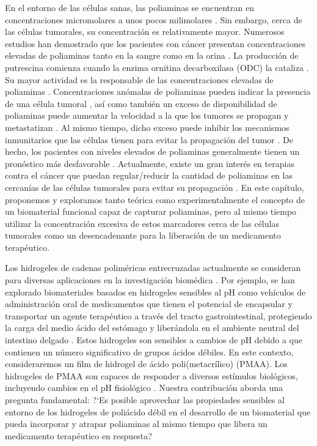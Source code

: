 En el entorno de las c\'elulas sanas, las poliaminas se encuentran en concentraciones micromolares a unos pocos milimolares \cite{porter1983, Russell}.
Sin embargo, cerca de las c\'elulas tumorales, su concentraci\'on es relativamente mayor.
Numerosos estudios han demostrado que los pacientes con c\'ancer presentan concentraciones elevadas de poliaminas tanto en la sangre como en la orina \cite{russell1971}. La producci\'on de putrescina comienza cuando la enzima ornitina decarboxilasa (ODC) la cataliza \cite{Soda2011,casero2009,pegg2010}. Su mayor actividad es la responsable de las concentraciones elevadas de poliaminas \cite{Soda2011,agostinelli2010polyamines,nowotarski2013}.
Concentraciones an\'omalas de poliaminas pueden indicar la presencia de una c\'elula tumoral \cite{park2013,gerner2004}, as\'i como tambi\'en un exceso de disponibilidad de poliaminas puede aumentar la velocidad a la que los tumores se propagan y metastatizan \cite{Soda2011}.
Al mismo tiempo, dicho exceso puede inhibir los mecanismos inmunitarios que las c\'elulas tienen para evitar la propagaci\'on del tumor \cite{Soda2011,jasnis1994polyamines}.
De hecho, los pacientes con niveles elevados de poliaminas generalmente tienen un pron\'ostico m\'as desfavorable \cite{Soda2011,ikeda2011montmorillonite}.
Actualmente, existe un gran inter\'es en terapias contra el c\'ancer que puedan regular/reducir la cantidad de poliaminas en las cercan\'ias de las c\'elulas tumorales para evitar su propagaci\'on \cite{Soda2011,aziz1996potential,chen2006combination, bachrach2004polyamines}.
En este cap\'itulo, proponemos y exploramos tanto te\'orica como experimentalmente el concepto de un biomaterial funcional capaz de capturar poliaminas, pero al mismo tiempo utilizar la concentraci\'on excesiva de estos marcadores cerca de las c\'elulas tumorales como un desencadenante para la liberaci\'on de un medicamento terap\'eutico.

Los hidrogeles de cadenas polim\'ericas entrecruzadas actualmente se consideran para diversas aplicaciones en la investigaci\'on biom\'edica \cite{wang2019}.
Por ejemplo, se han explorado biomateriales basados en hidrogeles sensibles al pH como veh\'iculos de administraci\'on oral de medicamentos que tienen el potencial de encapsular y transportar un agente terap\'eutico a trav\'es del tracto gastrointestinal, protegiendo la carga del medio \'acido del est\'omago y liber\'andola en el ambiente neutral del intestino delgado  \cite{lowman1999oral,zhao2019,qindeel2019,Li2019}.
Estos hidrogeles son sensibles a cambios de pH debido a que contienen un n\'umero significativo de grupos \'acidos d\'ebiles.
En este contexto, consideraremos un film de hidrogel de \'acido poli(metacr\'ilico) (PMAA).
Los hidrogeles de PMAA son capaces de responder a diversos est\'imulos biol\'ogicos, incluyendo cambios en el pH fisiol\'ogico \cite{kanamala2016mechanisms}.
Nuestra contribuci\'on aborda una pregunta fundamental: ?`Es posible aprovechar las propiedades sensibles al entorno de los hidrogeles de poli\'acido d\'ebil en el desarrollo de un biomaterial que pueda incorporar y atrapar poliaminas al mismo tiempo que libera un medicamento terap\'eutico en respuesta?

